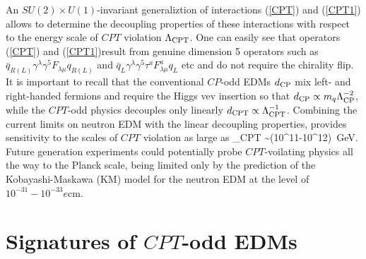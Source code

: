 \documentclass[prl,twocolumn,tightenlines,preprintnumbers,floatfix,nofootinbib]{revtex4}
\begin{document}
An $SU(2)\times U(1)$-invariant generaliztion of interactions (\ref{CPT}) and (\ref{CPT1})
allows to determine the decoupling properties of these interactions with respect to 
the energy scale of $CPT$ violation $\Lambda_{\rm CPT}$. 
One can easily see that operators (\ref{CPT}) and (\ref{CPT1})result from genuine dimension 
5 operators such as $\bar q_{R(L)} \gamma^\lambda \gamma^5 F_{\lambda\mu} q_{R(L)}$
and $\bar q_L \gamma^\lambda \gamma^5 \tau^a F^a_{\lambda\mu} q_L$ etc and do not
require the chirality flip.  It is important 
to recall that the conventional $CP$-odd EDMs $d_{\rm CP}$ 
mix left- and right-handed fermions and require the 
Higgs vev insertion so that $d_{\rm CP} \propto m_q\Lambda_{\rm CP}^{-2}$,
while the $CPT$-odd physics decouples only linearly $d_{\rm CPT} \propto 
\Lambda_{\rm CPT}^{-1}$. Combining the current limits on neutron EDM with the
linear decoupling properties, provides sensitivity to the scales of $CPT$ violation as 
large as
\be
\Lambda_{\rm CPT} \sim (10^{11}-10^{12})~{\rm GeV}.
\label{range}
\ee
Future generation experiments could 
potentially probe $CPT$-voilating physics all the way to the Planck 
scale, being limited only by the prediction of the Kobayashi-Maskawa (KM) model for the 
neutron EDM at the level of $10^{-31}-10^{-33}e$cm.

\section{Signatures of $CPT$-odd EDMs}
\end{document}
